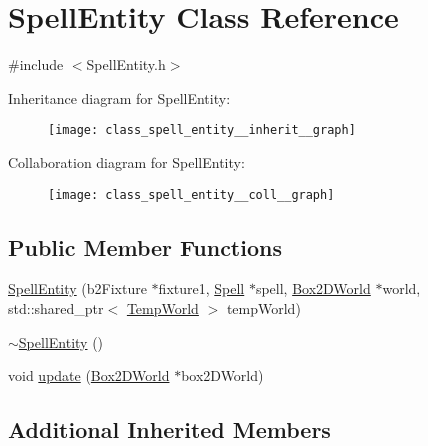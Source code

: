\hypertarget{class_spell_entity}{\section{Spell\-Entity Class Reference}
\label{class_spell_entity}
}


{\ttfamily \#include $<$Spell\-Entity.\-h$>$}



Inheritance diagram for Spell\-Entity\-:
\nopagebreak
\begin{figure}[H]
\begin{center}
\leavevmode
\texttt{[image: class\_spell\_entity\_\_inherit\_\_graph]}
\end{center}
\end{figure}


Collaboration diagram for Spell\-Entity\-:
\nopagebreak
\begin{figure}[H]
\begin{center}
\leavevmode
\texttt{[image: class\_spell\_entity\_\_coll\_\_graph]}
\end{center}
\end{figure}
\subsection*{Public Member Functions}
\begin{DoxyCompactItemize}
\item 
\hyperlink{class_spell_entity_ae110221a8a5a2c2676cdcf45658de22a}{Spell\-Entity} (b2\-Fixture $\ast$fixture1, \hyperlink{class_spell}{Spell} $\ast$spell, \hyperlink{class_box2_d_world}{Box2\-D\-World} $\ast$world, std\-::shared\-\_\-ptr$<$ \hyperlink{_server_8hpp_ac147588bd69e1d052194e0dea10202ff}{Temp\-World} $>$ temp\-World)
\item 
\hyperlink{class_spell_entity_a517da658f8eede448f41edccf53283f2}{$\sim$\-Spell\-Entity} ()
\item 
void \hyperlink{class_spell_entity_a3016a06a9f70f16ab4050643491bf978}{update} (\hyperlink{class_box2_d_world}{Box2\-D\-World} $\ast$box2\-D\-World)
\end{DoxyCompactItemize}
\subsection*{Additional Inherited Members}


